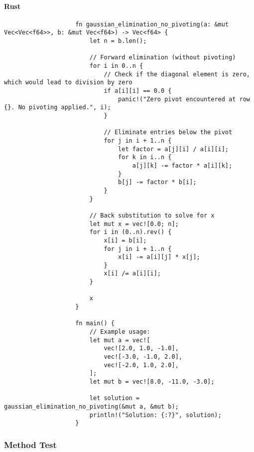 \documentclass{article}
\begin{document}
            \paragraph{Rust}
                \begin{verbatim}
                    fn gaussian_elimination_no_pivoting(a: &mut Vec<Vec<f64>>, b: &mut Vec<f64>) -> Vec<f64> {
                        let n = b.len();

                        // Forward elimination (without pivoting)
                        for i in 0..n {
                            // Check if the diagonal element is zero, which would lead to division by zero
                            if a[i][i] == 0.0 {
                                panic!("Zero pivot encountered at row {}. No pivoting applied.", i);
                            }

                            // Eliminate entries below the pivot
                            for j in i + 1..n {
                                let factor = a[j][i] / a[i][i];
                                for k in i..n {
                                    a[j][k] -= factor * a[i][k];
                                }
                                b[j] -= factor * b[i];
                            }
                        }

                        // Back substitution to solve for x
                        let mut x = vec![0.0; n];
                        for i in (0..n).rev() {
                            x[i] = b[i];
                            for j in i + 1..n {
                                x[i] -= a[i][j] * x[j];
                            }
                            x[i] /= a[i][i];
                        }

                        x
                    }

                    fn main() {
                        // Example usage:
                        let mut a = vec![
                            vec![2.0, 1.0, -1.0],
                            vec![-3.0, -1.0, 2.0],
                            vec![-2.0, 1.0, 2.0],
                        ];
                        let mut b = vec![8.0, -11.0, -3.0];

                        let solution = gaussian_elimination_no_pivoting(&mut a, &mut b);
                        println!("Solution: {:?}", solution);
                    }

                \end{verbatim}
        \subsubsection{Method Test}
\end{document}
